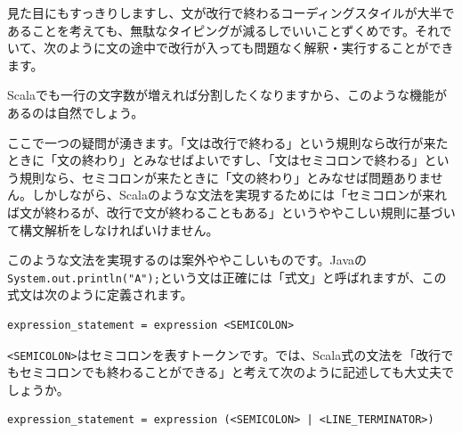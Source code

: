 \begin{Shaded}
\begin{Highlighting}[]
\NormalTok{(}\NormalTok{)}
\NormalTok{(}\NormalTok{)}
\NormalTok{(}\NormalTok{)}
\end{Highlighting}
\end{Shaded}

見た目にもすっきりしますし、文が改行で終わるコーディングスタイルが大半であることを考えても、無駄なタイピングが減るしでいいことずくめです。それでいて、次のように文の途中で改行が入っても問題なく解釈・実行することができます。

\begin{Shaded}
\begin{Highlighting}[]
\NormalTok{(}
  \NormalTok{)}
\NormalTok{(}
  \NormalTok{)}
\NormalTok{(}
  \NormalTok{)}
\end{Highlighting}
\end{Shaded}

Scalaでも一行の文字数が増えれば分割したくなりますから、このような機能があるのは自然でしょう。

ここで一つの疑問が湧きます。「文は改行で終わる」という規則なら改行が来たときに「文の終わり」とみなせばよいですし、「文はセミコロンで終わる」という規則なら、セミコロンが来たときに「文の終わり」とみなせば問題ありません。しかしながら、Scalaのような文法を実現するためには「セミコロンが来れば文が終わるが、改行で文が終わることもある」というややこしい規則に基づいて構文解析をしなければいけません。

このような文法を実現するのは案外ややこしいものです。Javaの\texttt{System.out.println("A");}という文は正確には「式文」と呼ばれますが、この式文は次のように定義されます。

\begin{verbatim}
expression_statement = expression <SEMICOLON>
\end{verbatim}

\texttt{\textless{}SEMICOLON\textgreater{}}はセミコロンを表すトークンです。では、Scala式の文法を「改行でもセミコロンでも終わることができる」と考えて次のように記述しても大丈夫でしょうか。

\begin{verbatim}
expression_statement = expression (<SEMICOLON> | <LINE_TERMINATOR>)
\end{verbatim}

